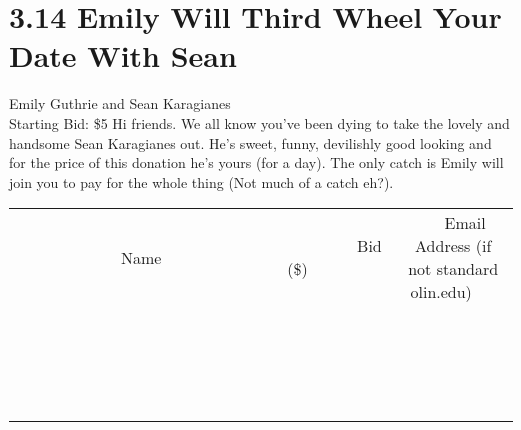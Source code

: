 \documentclass[11pt]{article}
\begin{document}
\section*{3.14 Emily Will Third Wheel Your Date With Sean}
Emily Guthrie and Sean Karagianes
\\
Starting Bid: \$5
\newline
Hi friends. We all know you've been dying to take the lovely and handsome Sean Karagianes out. He's sweet, funny, devilishly good looking and for the price of this donation he's yours (for a day). The only catch is Emily will join you to pay for the whole thing (Not much of a catch eh?).
\\[3ex]
\begin{tabular}{c c c}
~~~~~~~~~~~~~Name~~~~~~~~~~~~~ & ~~~~~~~~~Bid (\$)~~~~~~~~~  & ~~~Email Address (if not standard olin.edu)~~~\\
 & & \\
\hline
 & & \\
\hline
 & & \\
\hline
 & & \\
\hline
 & & \\
\hline
 & & \\
\hline
 & & \\
\hline
 & & \\
\hline
 & & \\
\hline
 & & \\
\hline
 & & \\
\hline
 & & \\
\hline
 & & \\
\hline
 & & \\
\hline
 & & \\
\hline
 & & \\
\hline
 & & \\
\hline
 & & \\
\hline
 & & \\
\hline
\end{tabular}
\newpage
\end{document}
